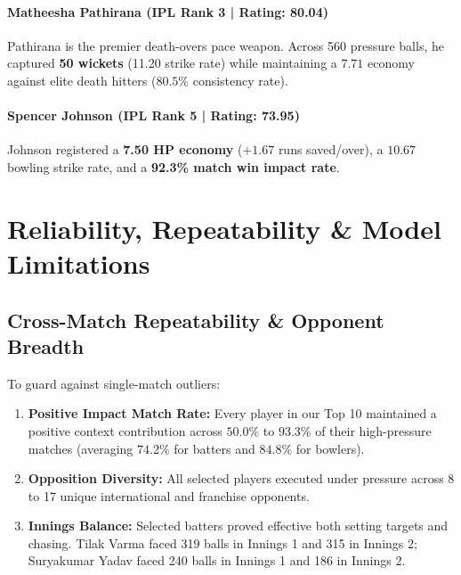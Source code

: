 \documentclass[11pt,a4paper]{article}
\begin{document}
\paragraph{Matheesha Pathirana (IPL Rank 3 | Rating: 80.04)}
Pathirana is the premier death-overs pace weapon. Across 560 pressure balls, he captured \textbf{50 wickets} (11.20 strike rate) while maintaining a $7.71$ economy against elite death hitters ($80.5\%$ consistency rate).

\paragraph{Spencer Johnson (IPL Rank 5 | Rating: 73.95)}
Johnson registered a \textbf{7.50 HP economy} ($+1.67$ runs saved/over), a $10.67$ bowling strike rate, and a \textbf{92.3\% match win impact rate}.

\section{Reliability, Repeatability \& Model Limitations}

\subsection{Cross-Match Repeatability \& Opponent Breadth}
To guard against single-match outliers:
\begin{enumerate}[leftmargin=*,itemsep=2pt]
    \item \textbf{Positive Impact Match Rate:} Every player in our Top 10 maintained a positive context contribution across $50.0\%$ to $93.3\%$ of their high-pressure matches (averaging $74.2\%$ for batters and $84.8\%$ for bowlers).
    \item \textbf{Opposition Diversity:} All selected players executed under pressure across 8 to 17 unique international and franchise opponents.
    \item \textbf{Innings Balance:} Selected batters proved effective both setting targets and chasing. Tilak Varma faced 319 balls in Innings 1 and 315 in Innings 2; Suryakumar Yadav faced 240 balls in Innings 1 and 186 in Innings 2.
\end{enumerate}
\end{document}
